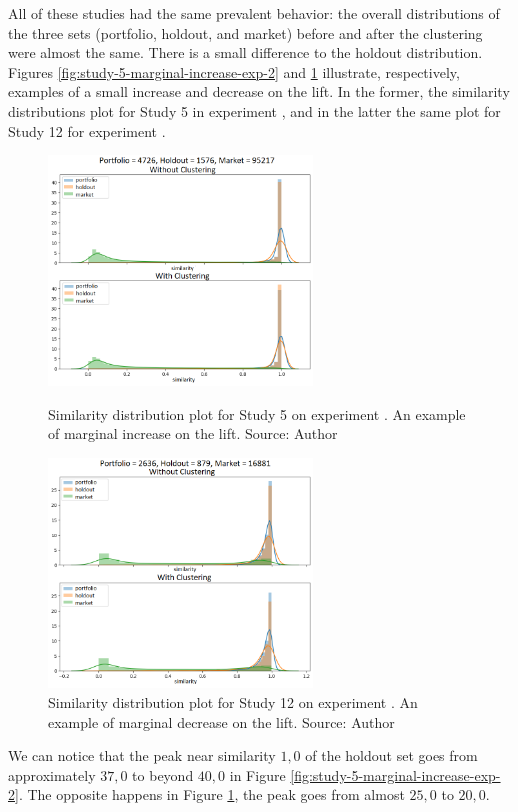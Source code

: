 All of these studies had the same prevalent behavior: the overall distributions of the three sets (portfolio, holdout, and market) before and after the clustering were almost the same. There is a small difference to the holdout distribution. Figures \ref{fig:study-5-marginal-increase-exp-2} and \ref{fig:study-12-marginal-decrease-exp-1} illustrate, respectively, examples of a small increase and decrease on the lift. In the former, the similarity distributions plot for Study 5 in experiment \nameExperimentII{}, and in the latter the same plot for Study 12 for experiment \nameExperimentI{}.

\begin{figure}[h]
   \centering
   \includegraphics[width=7cm]{fig/ch4-study-5-marginal-increase-exp-2.png}
   \caption{Similarity distribution plot for Study 5 on experiment \nameExperimentII{}. An example of marginal increase on the lift. Source: Author}
   \label{fig:study-5-marginal-increase-exp-2}

   \includegraphics[width=7cm]{fig/ch4-study-12-marginal-decrease-exp-1.png}
   \caption{Similarity distribution plot for Study 12 on experiment \nameExperimentI{}. An example of marginal decrease on the lift. Source: Author}
   \label{fig:study-12-marginal-decrease-exp-1}
\end{figure}

We can notice that the peak near similarity $1,0$ of the holdout set goes from approximately $37,0$ to beyond $40,0$ in Figure \ref{fig:study-5-marginal-increase-exp-2}. The opposite happens in Figure \ref{fig:study-12-marginal-decrease-exp-1}, the peak goes from almost $25,0$ to $20,0$.

